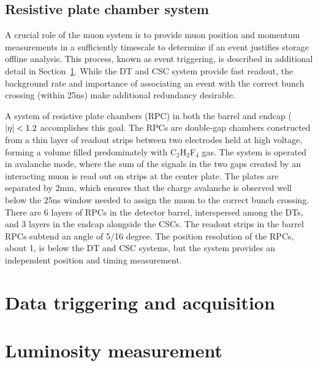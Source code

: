 \subsection{Resistive plate chamber system}

A crucial role of the muon system is to provide muon position and momentum
measurements in a sufficiently timescale
to determine if an event justifies storage offline analysis. 
This process, known as event triggering,
is described in additional detail in Section~\ref{sec:triggering}.
While the DT and CSC system provide fast readout, the background rate and
importance of associating an event with the correct bunch crossing (within
25\unit{ns}) make additional redundancy desirable.

A system of resistive plate chambers (RPC) in both the barrel and endcap
($\lvert \eta \rvert < 1.2$ accomplishes this goal. The RPCs are double-gap chambers
constructed from a thin layer of readout strips between two electrodes held 
at high voltage, forming a volume filled predominately with C$_2$H$_2$F$_4$ gas.
The system is operated in avalanche mode, where the sum of the signals
in the two gaps created by an interacting muon is read out on strips
at the center plate. The plates are separated by 2\unit{mm}, which ensures
that the charge avalanche is observed well below the 25\unit{ns} window
needed to assign the muon to the correct bunch crossing.
There are 6 layers of RPCs in the detector barrel, interspersed among the DTs,
and 3 layers in the endcap alongside the CSCs. The readout strips in the barrel RPCs
subtend an angle of 5/16 degree. The position resolution of the RPCs, about 1\cm,
is below the DT and CSC systems, but the system provides an independent position
and timing measurement. 

\section{Data triggering and acquisition}
\label{sec:triggering}
\section{Luminosity measurement}
